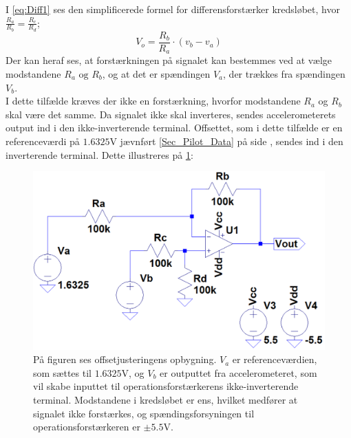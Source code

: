 \noindent I \eqref{eq:Diff1} ses den simplificerede formel for differensforstærker kredsløbet, hvor $\frac{R_a}{R_b} = \frac{R_c}{R_d}$;
\begin{equation}\label{eq:Diff1}
V_o = \frac{R_b}{R_a} \cdot (v_b - v_a)
\end{equation}
\noindent Der kan heraf ses, at forstærkningen på signalet kan bestemmes ved at vælge modstandene $R_a\text{ og }R_b$, og at det er spændingen $V_{a}$, der trækkes fra spændingen $V_{b}$. \\
I dette tilfælde kræves der ikke en forstærkning, hvorfor modstandene $R_{a}$ og $R_{b}$ skal være det samme. Da signalet ikke skal inverteres, sendes accelerometerets output ind i den ikke-inverterende terminal. Offsettet, som i dette tilfælde er en referenceværdi på $1.6325$V jævnført \ref{Sec_Pilot_Data} på side \pageref{Sec_Pilot_Data}, sendes ind i den inverterende terminal. Dette illustreres på \ref{fig:Offset_generisk}:
\begin{figure}[H]
\centering
\includegraphics[scale=0.4]{figures/cProblemloesning/Offset_generisk.png}
\caption{På figuren ses offsetjusteringens opbygning. $V_{a}$ er referenceværdien, som sættes til $1.6325$V, og $V_{b}$ er outputtet fra accelerometeret, som vil skabe inputtet til operationsforstærkerens ikke-inverterende terminal. Modstandene i kredsløbet er ens, hvilket medfører at signalet ikke forstærkes, og spændingsforsyningen til operationsforstærkeren er $\pm5.5$V.}
\label{fig:Offset_generisk}
\end{figure}

